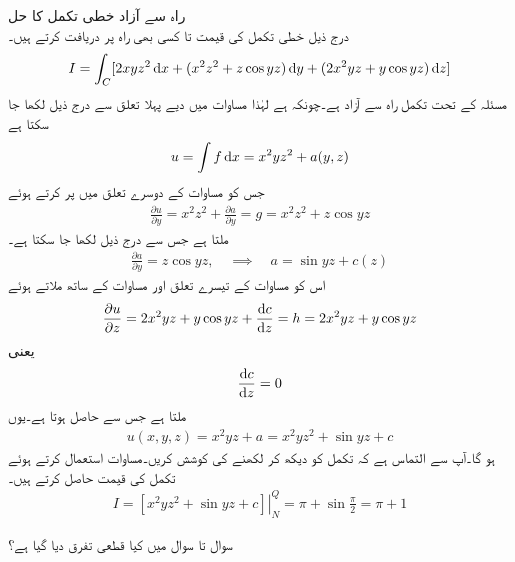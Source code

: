 \quad راہ سے آزاد خطی تکمل کا حل\\
درج ذیل خطی تکمل کی قیمت  تا  کسی بھی راہ پر دریافت کرتے ہیں۔
\begin{align*}
I=\int_C[2xyz^2\dif x+(x^2z^2+z\cos yz)\dif y+(2x^2yz+y\cos yz)\dif z]
\end{align*}
مسئلہ  کے تحت تکمل راہ سے آزاد ہے۔چونکہ  ہے لہٰذا  مساوات  میں دیے پہلا تعلق سے درج ذیل لکھا جا سکتا ہے
\begin{align}\label{مساوات_خطی_تکمل_راہ_سے_آزاد_مثال_الف}
u=\int f\dif x=x^2yz^2+a(y,z)
\end{align} 
جس کو مساوات  کے دوسرے تعلق میں پر کرتے ہوئے
\begin{align*}
\frac{\partial u}{\partial y}=x^2z^2+\frac{\partial a}{\partial y}=g=x^2z^2+z\cos yz
\end{align*}
ملتا ہے جس سے درج ذیل لکھا جا سکتا ہے۔
\begin{align*}
\frac{\partial a}{\partial y}=z\cos yz,\quad \implies \quad a=\sin yz+c(z)
\end{align*}
اس کو مساوات  کے تیسرے تعلق اور مساوات  کے ساتھ ملاتے ہوئے
\begin{align*}
\frac{\partial u}{\partial z}=2x^2yz+y\cos yz+\frac{\dif c}{\dif z}=h=2x^2yz+y\cos yz
\end{align*}
یعنی
\begin{align*}
\frac{\dif c}{\dif z}=0
\end{align*}
ملتا ہے جس سے  حاصل ہوتا ہے۔یوں
\begin{align*}
u(x,y,z)=x^2yz+a=x^2yz^2+\sin yz+c
\end{align*}
ہو گا۔آپ سے التماس ہے کہ تکمل کو دیکھ کر  لکھنے کی کوشش کریں۔مساوات  استعمال کرتے ہوئے تکمل کی قیمت حاصل کرتے ہیں۔
\begin{align*}
I=\left.[x^2yz^2+\sin yz+c]\right|_N^Q=\pi+\sin \frac{\pi}{2}=\pi+1
\end{align*}

سوال  تا سوال  میں کیا قطعی تفرق دیا گیا ہے؟

